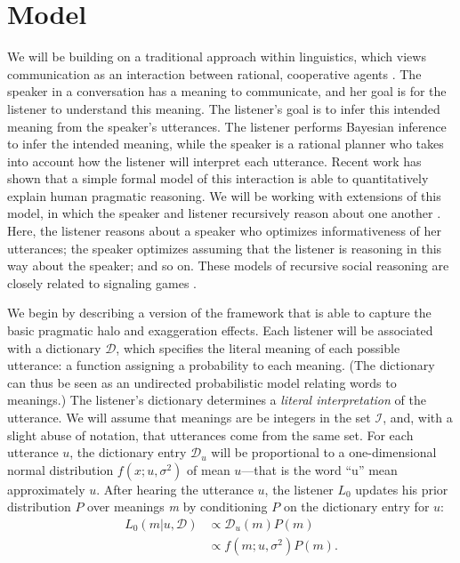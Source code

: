 \documentclass{article} %
\newcommand{\dictionary}{\ensuremath{\mathcal{D}}\xspace}
\begin{document}

\section{Model}

We will be building on a traditional approach within linguistics, which views communication as an interaction between rational, cooperative agents \cite{grice1975}. The speaker in a conversation has a meaning to communicate, and her goal is for the listener to understand this meaning. The listener's goal is to infer this intended meaning from the speaker's utterances. The listener performs Bayesian inference to infer the intended meaning, while the speaker is a rational planner who takes into account how the listener will interpret each utterance. 
Recent work \cite{frankgoodmanscience, godmanstuhlmueller} has shown that a simple formal model of this interaction is able to quantitatively explain human pragmatic reasoning. We will be working with extensions of this model, in which the speaker and listener recursively reason about one another \cite{jager2009pragmatic, bergen2012, franke, etc}. Here, the listener reasons about a speaker who optimizes informativeness of her utterances; the speaker optimizes assuming that the listener is reasoning in this way about the speaker; and so on. These models of recursive social reasoning are closely related to signaling games \cite{cho1987signaling, chen2008selecting}.

We begin by describing a version of the framework that is able to capture the basic pragmatic halo and exaggeration effects.
Each listener will be associated with a dictionary $\dictionary$, which specifies the literal meaning of each possible utterance: a function assigning a probability to each meaning. (The dictionary can thus be seen as an undirected probabilistic model relating words to meanings.) The listener's dictionary determines a \emph{literal interpretation} of the utterance. We will assume that meanings are be integers in the set $\mathcal{I}$, and, with a slight abuse of notation, that utterances come from the same set. For each utterance $u$, the dictionary entry $\dictionary_u$ will be proportional to a one-dimensional normal distribution $f(x;u,\sigma^2)$ of mean $u$---that is the word ``u'' mean approximately $u$. After hearing the utterance $u$, the listener $L_0$ updates his prior distribution $P$ over meanings \emph{m} by conditioning $P$ on the dictionary entry for $u$:
\begin{align}\label{eq:literallistener}
L_0(m | u, \dictionary) &\propto \dictionary_u(m)P(m) \\
&\propto f(m;u,\sigma^2)P(m).
\end{align}
\end{document}
